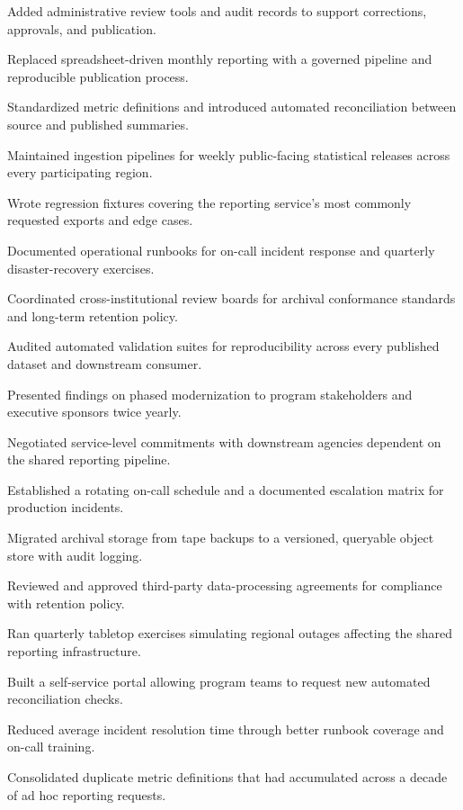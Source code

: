 \documentclass[fontsize=11pt, margin=narrow, medium=print]{careerdossier-resume}
\begin{document}
\begin{CDossierEntry}[title = {Modernization Program}, organization = {Continental Reliability Consortium}, location = {Ottawa, ON}, dates = {2010--Present}]
\begin{CDossierItemize}
    \item Added administrative review tools and audit records to support corrections, approvals, and publication.
    \item Replaced spreadsheet-driven monthly reporting with a governed pipeline and reproducible publication process.
    \item Standardized metric definitions and introduced automated reconciliation between source and published summaries.
    \item Maintained ingestion pipelines for weekly public-facing statistical releases across every participating region.
    \item Wrote regression fixtures covering the reporting service's most commonly requested exports and edge cases.
    \item Documented operational runbooks for on-call incident response and quarterly disaster-recovery exercises.
    \item Coordinated cross-institutional review boards for archival conformance standards and long-term retention policy.
    \item Audited automated validation suites for reproducibility across every published dataset and downstream consumer.
    \item Presented findings on phased modernization to program stakeholders and executive sponsors twice yearly.
    \item Negotiated service-level commitments with downstream agencies dependent on the shared reporting pipeline.
    \item Established a rotating on-call schedule and a documented escalation matrix for production incidents.
    \item Migrated archival storage from tape backups to a versioned, queryable object store with audit logging.
    \item Reviewed and approved third-party data-processing agreements for compliance with retention policy.
    \item Ran quarterly tabletop exercises simulating regional outages affecting the shared reporting infrastructure.
    \item Built a self-service portal allowing program teams to request new automated reconciliation checks.
    \item Reduced average incident resolution time through better runbook coverage and on-call training.
    \item Consolidated duplicate metric definitions that had accumulated across a decade of ad hoc reporting requests.

\end{CDossierItemize}
\end{CDossierEntry}
\end{document}
